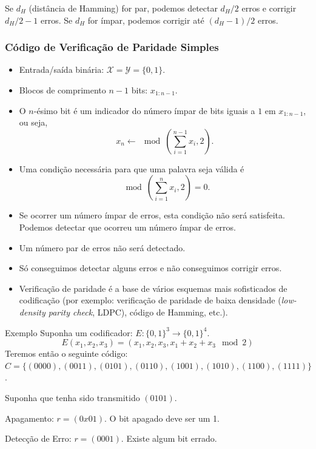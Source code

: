 \begin{frame}[allowframebreaks]
	Se $d_H$ (distância de Hamming) for par, podemos detectar $d_H/2$ erros
	e corrigir $d_H/2 - 1$ erros.
	Se $d_H$ for ímpar, podemos corrigir até $(d_H - 1)/2$ erros.
\end{frame}

\begin{frame}[allowframebreaks]
  \frametitle{Código de Verificação de Paridade Simples}
  \begin{itemize}
  \item Entrada/saída binária: $\mathcal{X} = \mathcal{Y} = \{ 0, 1\}$.
  \item Blocos de comprimento $n-1$ bits: $x_{1:n-1}$.
  \item O $n$-ésimo bit é um indicador do número ímpar de bits iguais a $1$ em $x_{1:n-1}$, ou seja,
	\begin{equation}
	x_n \leftarrow \mod \left( \sum_{i=1}^{n-1} x_i , 2 \right) .
	\end{equation}
  \item Uma condição necessária para que uma palavra seja válida é
	\begin{equation}
	\mod \left( \sum_{i=1}^{n} x_i , 2 \right) = 0 .
	\end{equation}
  \item Se ocorrer um número ímpar de erros, esta condição não será satisfeita. Podemos detectar que ocorreu um número ímpar de erros.
  \item Um número par de erros não será detectado.
  \item Só conseguimos detectar alguns erros e não conseguimos corrigir erros.
  \item Verificação de paridade é a base de vários esquemas mais sofisticados de codificação 
	(por exemplo: verificação de paridade de baixa densidade (\textit{low-density parity check}, LDPC),
	código de Hamming, etc.).
  \end{itemize}

  \framebreak
  \begin{block}{Exemplo}
    Suponha um codificador: $E: \{0,1\}^3 \rightarrow \{0,1\}^4$.
    \begin{equation}
      E(x_1,x_2,x_3) = (x_1, x_2, x_3, x_1 + x_2 + x_3 \mod 2)
    \end{equation}
    Teremos então o seguinte código: $C = \{ (0000), (0011), (0101), (0110), (1001), (1010), (1100), (1111)\}$.

    Suponha que tenha sido transmitido $(0101)$.

    Apagamento: $r = (0x01)$. O bit apagado deve ser um 1.
    
    Detecção de Erro: $r = (0001)$. Existe algum bit errado.
  \end{block}
\end{frame}



